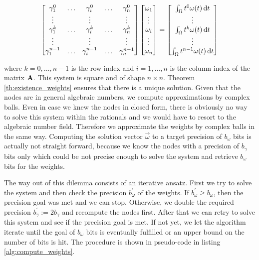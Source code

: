 \documentclass[a4paper,10pt]{article}
\begin{document}
\begin{equation}
  \label{eq:linsys_for_weights_matrix}
  \begin{bmatrix}
    \gamma_1^0     & \hdots & \gamma_i^0     & \hdots & \gamma_n^0 \\
    \vdots         & {}     & \vdots         & {}     & \vdots \\
    \gamma_1^k     & \hdots & \gamma_i^k     & \hdots & \gamma_n^k \\
    \vdots         & {}     & \vdots         & {}     & \vdots \\
    \gamma_1^{n-1} & \hdots & \gamma_i^{n-1} & \hdots & \gamma_n^{n-1}
  \end{bmatrix}
  \begin{bmatrix}
    \omega_1 \\
    \vdots \\
    \omega_i \\
    \vdots \\
    \omega_n
  \end{bmatrix}
  =
  \begin{bmatrix}
  \int_{\Omega} t^0 \omega(t) \,\mathrm{d}t \\
  \vdots \\
  \int_{\Omega} t^k \omega(t) \,\mathrm{d}t \\
  \vdots \\
  \int_{\Omega} t^{n-1} \omega(t) \,\mathrm{d}t
  \end{bmatrix}
\end{equation}

where $k = 0, \ldots, n-1$ is the row index and $i = 1, \ldots, n$
is the column index of the matrix $\mathbf{A}$. This system is square
and of shape $n \times n$. Theorem \ref{th:existence_weights} ensures that there is
a unique solution. Given that the nodes are in general algebraic numbers,
we compute approximations by complex balls.
Even in case we knew the nodes in closed form, there is obviously
no way to solve this system within the rationals and we would have to resort
to the algebraic number field. Therefore we approximate the weights by complex
balls in the same way. Computing the solution vector $\vec{\omega}$ to a target
precision of $b_{\omega}$ bits is actually not straight forward, because we know
the nodes with a precision of $b_{\gamma}$ bits only which could be not precise
enough to solve the system and retrieve $b_{\omega}$ bits for the weights.

The way out of this dilemma consists of an iterative ansatz. First we try to
solve the system and then check the precision $b_{\omega}^{\prime}$ of the
weights. If $b_{\omega}^{\prime} \geq b_{\omega}$, then the precision goal was
met and we can stop. Otherwise, we double the required precision
$b_{\gamma}^{\prime} := 2 b_{\gamma}$ and recompute the nodes first. After
that we can retry to solve this system and see if the precision goal is met.
If not yet, we let the algorithm iterate until the goal of $b_{\omega}$ bits
is eventually fulfilled or an upper bound on the number of bits is hit.
The procedure is shown in pseudo-code in listing \ref{alg:compute_weights}.
\end{document}
